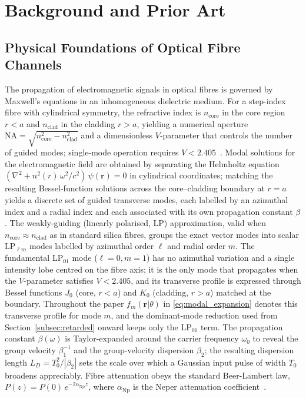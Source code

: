 \documentclass[journal,twocolumn]{IEEEtran}
\theoremstyle{definition}
\theoremstyle{plain}
\begin{document}
\section{Background and Prior Art}
\label{sec:background}

\subsection{Physical Foundations of Optical Fibre Channels}
\label{subsec:physical_foundations}

The propagation of electromagnetic signals in optical fibres is
governed by Maxwell's equations in an inhomogeneous dielectric
medium.  For a step-index fibre with cylindrical symmetry, the
refractive index is $n_{\mathrm{core}}$ in the core region $r < a$
and $n_{\mathrm{clad}}$ in the cladding $r > a$, yielding a
numerical aperture $\mathrm{NA}=\sqrt{n_{\mathrm{core}}^2 -
n_{\mathrm{clad}}^2}$ and a dimensionless $V$-parameter that
controls the number of guided modes; single-mode operation requires
$V < 2.405$~\cite{snyder1983}.  Modal solutions for the
electromagnetic field are obtained by separating the Helmholtz
equation $(\nabla^2 + n^2(r)\,\omega^2/c^2)\,\psi(\mathbf r) = 0$ in
cylindrical coordinates; matching the resulting Bessel-function
solutions across the core--cladding boundary at $r=a$ yields a
discrete set of guided transverse modes, each labelled by an
azimuthal index and a radial index and each associated with its own
propagation constant $\beta$. The weakly-guiding (linearly polarised,
LP) approximation, valid when $n_{\mathrm{core}} \approx
n_{\mathrm{clad}}$ as in standard silica fibres, groups the exact
vector modes into scalar $\mathrm{LP}_{\ell m}$ modes labelled by
azimuthal order $\ell$ and radial order $m$. The fundamental
$\mathrm{LP}_{01}$ mode ($\ell=0,m=1$) has no azimuthal variation and
a single intensity lobe centred on the fibre axis; it is the only
mode that propagates when the $V$-parameter satisfies $V<2.405$, and
its transverse profile is expressed through Bessel functions $J_0$
(core, $r<a$) and $K_0$ (cladding, $r>a$) matched at the boundary.
Throughout the paper $f_m(\mathbf r|\theta)$ in
\eqref{eq:modal_expansion} denotes this transverse profile for mode
$m$, and the dominant-mode reduction used from
Section~\ref{subsec:retarded} onward keeps only the $\mathrm{LP}_{01}$
term. The propagation constant $\beta(\omega)$ is Taylor-expanded
around the carrier frequency $\omega_0$ to reveal the group velocity
$\beta_1^{-1}$ and the group-velocity dispersion $\beta_2$; the
resulting dispersion length $L_D = T_0^2/|\beta_2|$ sets the scale
over which a Gaussian input pulse of width $T_0$ broadens
appreciably.  Fibre attenuation obeys the standard Beer-Lambert law,
$P(z) = P(0)\,e^{-2\alpha_{\mathrm{Np}}z}$, where $\alpha_{\mathrm{Np}}$
is the Neper attenuation coefficient~\cite{agrawal2007}.
\end{document}
